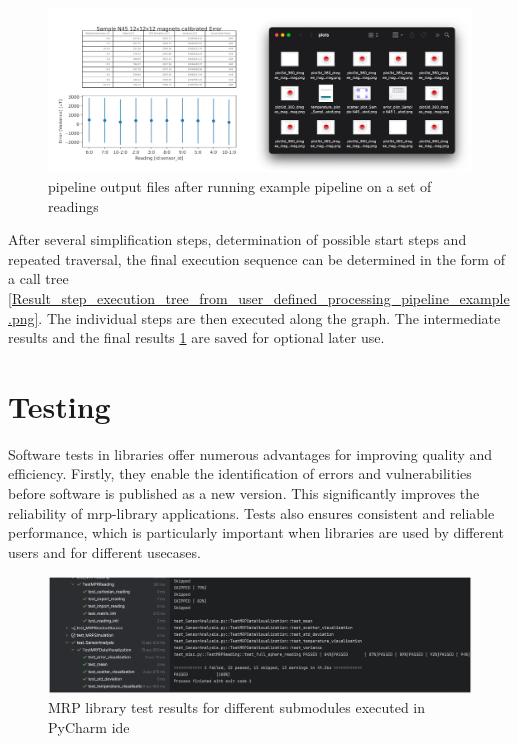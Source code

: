 \begin{figure}
\centering
\includegraphics{./generated_images/border_pipeline_output_files_after_running_example_pipeline_on_a_set_of_readings.png}
\caption{pipeline output files after running example pipeline on a set
of readings
\label{pipeline_output_files_after_running_example_pipeline_on_a_set_of_readings.png}}
\end{figure}

After several simplification steps, determination of possible start
steps and repeated traversal, the final execution sequence can be
determined in the form of a call tree
\ref{Result_step_execution_tree_from_user_defined_processing_pipeline_example.png}.
The individual steps are then executed along the graph. The intermediate
results and the final results
\ref{pipeline_output_files_after_running_example_pipeline_on_a_set_of_readings.png}
are saved for optional later use.

\hypertarget{testing}{%
\section{Testing}\label{testing}}

Software tests in libraries offer numerous advantages for improving
quality and efficiency. Firstly, they enable the identification of
errors and vulnerabilities before software is published as a new
version. This significantly improves the reliability of
\gls{mrp}-library applications. Tests also ensures consistent and
reliable performance, which is particularly important when libraries are
used by different users and for different usecases.

\begin{figure}
\centering
\includegraphics{./generated_images/border_MRP_library_test_results_for_different_submodules_executed_in_PyCharm_(+ide).png}
\caption{MRP library test results for different submodules executed in
PyCharm \gls{ide}
\label{MRP_library_test_results_for_different_submodules_executed_in_PyCharm_(+ide).png}}
\end{figure}

